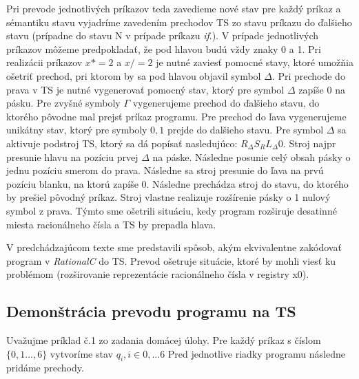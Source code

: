 \documentclass[10pt]{article}
\begin{document}
Pri prevode jednotlivých príkazov teda zavedieme nové stav pre každý príkaz a sémantiku stavu
vyjadríme zavedením prechodov TS zo stavu príkazu do ďalšieho stavu (prípadne do stavu N v prípade
príkazu \textit{if}.). V prípade jednotlivých príkazov môžeme predpokladať, že pod hlavou budú vždy
znaky 0 a 1.
Pri realizácii príkazov $x *= 2$ a $x /= 2$ je nutné zaviesť pomocné stavy, ktoré umožňia ošetriť prechod, pri ktorom by sa pod hlavou objavil symbol 
$\Delta$. Pri prechode do prava v TS je nutné vygenerovať pomocný stav, ktorý pre symbol $\Delta$ zapíše 0 na pásku. Pre zvyšné symboly $\Gamma$ vygenerujeme prechod do ďalšieho stavu,
do ktorého pôvodne mal prejsť príkaz programu.
Pre prechod do ľava vygenerujeme unikátny stav, ktorý pre symboly ${0,1}$ prejde do dalšieho stavu. Pre symbol $\Delta$ sa aktivuje podstroj TS, ktorý sa dá popísať nasledujúco:
$R_\Delta S_R L_\Delta 0$.
Stroj najpr presunie hlavu na pozíciu prvej $\Delta$ na páske. Následne posunie celý obsah pásky o jednu pozíciu smerom do prava. Následne sa stroj presunie do ľava na prvú pozíciu
blanku, na ktorú zapíše 0. Následne prechádza stroj do stavu, do ktorého by prešiel pôvodný príkaz.
Stroj vlastne realizuje rozšírenie pásky o 1 nulový symbol z prava. Týmto sme ošetrili situáciu, kedy program rozširuje desatinné miesta racionálneho čísla a TS by prepadla hlava.

V predchádzajúcom texte sme predstavili spôsob, akým ekvivalentne zakódovať program v \textit{RationalC} do TS. Prevod ošetruje situácie, ktoré by mohli viesť ku problémom (rozširovanie reprezentácie
racionálneho čísla v registry x0).

\subsection*{Demonštrácia prevodu programu na TS}
Uvažujme príklad č.1 zo zadania domácej úlohy. Pre každý príkaz s číslom $\{0,1...,6\}$ vytvoríme stav $q_i, i \in {0,...6}$
Pred jednotlive riadky programu následne pridáme prechody.
\end{document}
